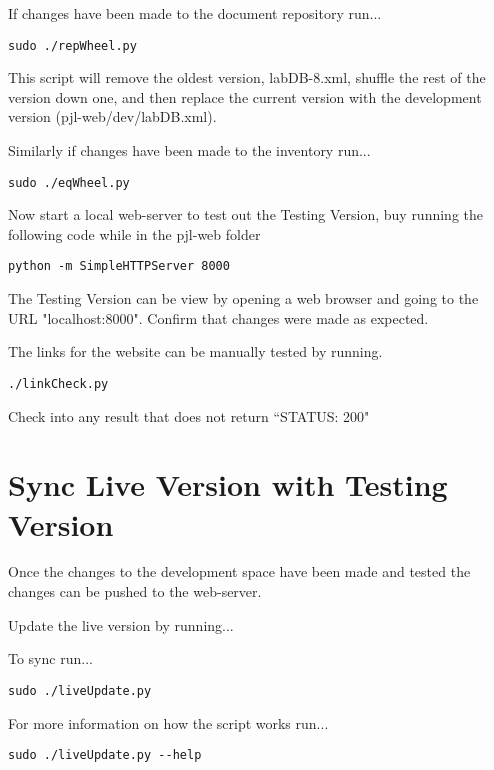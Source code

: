 \documentclass[justified]{LabArx1_5}
\begin{document}
If changes have been made to the document repository run...
\begin{lstlisting}[backgroundcolor = \color{light-gray}]
sudo ./repWheel.py
\end{lstlisting}

This script will remove the oldest version, labDB-8.xml, shuffle the rest of the version down one, and then replace the current version with the development version (pjl-web/dev/labDB.xml). 

Similarly if changes have been made to the inventory run...
\begin{lstlisting}[backgroundcolor = \color{light-gray}]
sudo ./eqWheel.py
\end{lstlisting}

Now start a local web-server to test out the Testing Version, buy running the following code while in the pjl-web folder

\begin{lstlisting}[backgroundcolor = \color{light-gray}]
python -m SimpleHTTPServer 8000
\end{lstlisting}

The Testing Version can be view by opening a web browser and going to the URL "localhost:8000". Confirm that changes were made as expected.

The links for the website can be manually tested by running.
\begin{lstlisting}[backgroundcolor = \color{light-gray}]
./linkCheck.py
\end{lstlisting}

Check into any result that does not return ``STATUS: 200"

\section{Sync Live Version with Testing Version}\label{sec:finalsync}

Once the changes to the development space have been made and tested the changes can be pushed to the web-server. 

Update the live version by running...

\noindent To sync run...
\begin{lstlisting}[backgroundcolor = \color{light-gray}]
sudo ./liveUpdate.py
\end{lstlisting}
\vspace{-1em}
\noindent For more information on how the script works run...

\begin{lstlisting}[backgroundcolor = \color{light-gray}]
sudo ./liveUpdate.py --help
\end{lstlisting}
\end{document}
